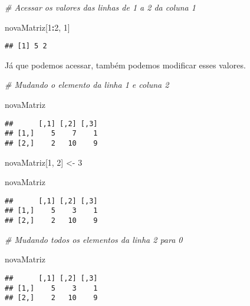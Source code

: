\documentclass[
]{article}
\newenvironment{Shaded}{\begin{snugshade}}{\end{snugshade}}
\newcommand{\CommentTok}[1]{\textcolor[rgb]{0.56,0.35,0.01}{\textit{#1}}}
\newcommand{\DecValTok}[1]{\textcolor[rgb]{0.00,0.00,0.81}{#1}}
\newcommand{\NormalTok}[1]{#1}
\newcommand{\OperatorTok}[1]{\textcolor[rgb]{0.81,0.36,0.00}{\textbf{#1}}}
\newcommand{\StringTok}[1]{\textcolor[rgb]{0.31,0.60,0.02}{#1}}
\begin{document}
\begin{Shaded}
\begin{Highlighting}[]
\CommentTok{# Acessar os valores das linhas de 1 a 2 da coluna 1}

\NormalTok{novaMatriz[}\DecValTok{1}\OperatorTok{:}\DecValTok{2}\NormalTok{, }\DecValTok{1}\NormalTok{]}
\end{Highlighting}
\end{Shaded}

\begin{verbatim}
## [1] 5 2
\end{verbatim}

Já que podemos acessar, também podemos modificar esses valores.

\begin{Shaded}
\begin{Highlighting}[]
\CommentTok{# Mudando o elemento da linha 1 e coluna 2}

\NormalTok{novaMatriz}
\end{Highlighting}
\end{Shaded}

\begin{verbatim}
##      [,1] [,2] [,3]
## [1,]    5    7    1
## [2,]    2   10    9
\end{verbatim}

\begin{Shaded}
\begin{Highlighting}[]
\NormalTok{novaMatriz[}\DecValTok{1}\NormalTok{, }\DecValTok{2}\NormalTok{] <-}\StringTok{ }\DecValTok{3}

\NormalTok{novaMatriz}
\end{Highlighting}
\end{Shaded}

\begin{verbatim}
##      [,1] [,2] [,3]
## [1,]    5    3    1
## [2,]    2   10    9
\end{verbatim}

\begin{Shaded}
\begin{Highlighting}[]
\CommentTok{# Mudando todos os elementos da linha 2 para 0}

\NormalTok{novaMatriz}
\end{Highlighting}
\end{Shaded}

\begin{verbatim}
##      [,1] [,2] [,3]
## [1,]    5    3    1
## [2,]    2   10    9
\end{verbatim}
\end{document}
